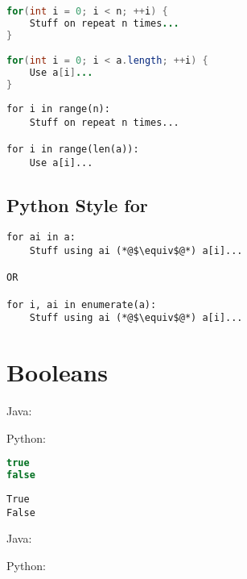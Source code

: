 \documentclass{article}
\begin{document}
\begin{minipage}{0.45\linewidth}
    \begin{lstlisting}[language=Java]
for(int i = 0; i < n; ++i) {
    Stuff on repeat n times...
}

for(int i = 0; i < a.length; ++i) {
    Use a[i]...
}
    \end{lstlisting}
\end{minipage}
\hfill
\begin{minipage}{0.45\linewidth}
    \begin{lstlisting}
for i in range(n):
    Stuff on repeat n times...

for i in range(len(a)):
    Use a[i]...
    \end{lstlisting}
\end{minipage}

\subsection{Python Style for}
\begin{lstlisting}
for ai in a:
    Stuff using ai (*@$\equiv$@*) a[i]...

OR

for i, ai in enumerate(a):
    Stuff using ai (*@$\equiv$@*) a[i]...
\end{lstlisting}

\section{Booleans}
\begin{minipage}{0.45\linewidth}
    Java:
\end{minipage}
\hfill
\begin{minipage}{0.45\linewidth}
    Python:
\end{minipage}

\begin{minipage}{0.45\linewidth}
    \begin{lstlisting}[language=Java]
true
false
    \end{lstlisting}
\end{minipage}
\hfill
\begin{minipage}{0.45\linewidth}
    \begin{lstlisting}
True
False
    \end{lstlisting}
\end{minipage}

\begin{minipage}{0.45\linewidth}
    Java:
\end{minipage}
\hfill
\begin{minipage}{0.45\linewidth}
    Python:
\end{minipage}
\end{document}
